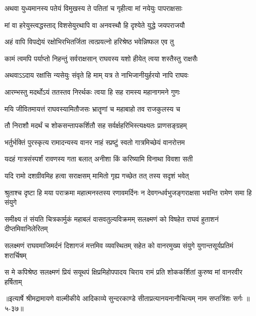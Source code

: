 \twolineshloka
{अथवा युध्यमानस्य पतेयं विमुखस्य ते}
{पतितां च गृहीत्वा मां नयेयुः पापराक्षसाः} %

\twolineshloka
{मां वा हरेयुस्त्वद्धस्ताद् विशसेयुरथापि वा}
{अनवस्थौ हि दृश्येते युद्धे जयपराजयौ} %

\twolineshloka
{अहं वापि विपद्येयं रक्षोभिरभितर्जिता}
{त्वत्प्रयत्नो हरिश्रेष्ठ भवेन्निष्फल एव तु} %

\twolineshloka
{कामं त्वमपि पर्याप्तो निहन्तुं सर्वराक्षसान्}
{राघवस्य यशो हीयेत् त्वया शस्तैस्तु राक्षसैः} %

\twolineshloka
{अथवाऽऽदाय रक्षांसि न्यसेयुः संवृते हि माम्}
{यत्र ते नाभिजानीयुर्हरयो नापि राघवः} %

\twolineshloka
{आरम्भस्तु मदर्थोऽयं ततस्तव निरर्थकः}
{त्वया हि सह रामस्य महानागमने गुणः} %

\twolineshloka
{मयि जीवितमायत्तं राघवस्यामितौजसः}
{भ्रातॄणां च महाबाहो तव राजकुलस्य च} %

\twolineshloka
{तौ निराशौ मदर्थं च शोकसन्तापकर्शितौ}
{सह सर्वर्क्षहरिभिस्त्यक्ष्यतः प्राणसङ्ग्रहम्} %

\twolineshloka
{भर्तुर्भक्तिं पुरस्कृत्य रामादन्यस्य वानर}
{नाहं स्प्रष्टुं स्वतो गात्रमिच्छेयं वानरोत्तम} %

\twolineshloka
{यदहं गात्रसंस्पर्शं रावणस्य गता बलात्}
{अनीशा किं करिष्यामि विनाथा विवशा सती} %

\twolineshloka
{यदि रामो दशग्रीवमिह हत्वा सराक्षसम्}
{मामितो गृह्य गच्छेत तत् तस्य सदृशं भवेत्} %

\twolineshloka
{श्रुताश्च दृष्टा हि मया पराक्रमा महात्मनस्तस्य रणावमर्दिनः}
{न देवगन्धर्वभुजङ्गराक्षसा भवन्ति रामेण समा हि संयुगे} %

\twolineshloka
{समीक्ष्य तं संयति चित्रकार्मुकं महाबलं वासवतुल्यविक्रमम्}
{सलक्ष्मणं को विषहेत राघवं हुताशनं दीप्तमिवानिलेरितम्} %

\twolineshloka
{सलक्ष्मणं राघवमाजिमर्दनं दिशागजं मत्तमिव व्यवस्थितम्}
{सहेत को वानरमुख्य संयुगे युगान्तसूर्यप्रतिमं शरार्चिषम्} %

\twolineshloka
{स मे कपिश्रेष्ठ सलक्ष्मणं प्रियं सयूथपं क्षिप्रमिहोपपादय}
{चिराय रामं प्रति शोककर्शितां कुरुष्व मां वानरवीर हर्षिताम्} %


॥इत्यार्षे श्रीमद्रामायणे वाल्मीकीये आदिकाव्ये सुन्दरकाण्डे सीताप्रत्यानयनानौचित्यम् नाम सप्तत्रिंशः सर्गः ॥५-३७॥
